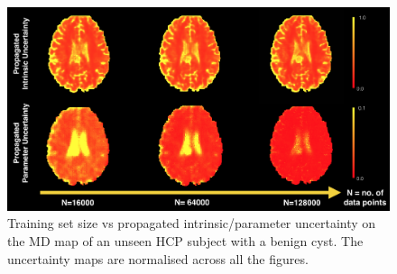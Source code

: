 \begin{figure}[ht] 
	\centering
	\includegraphics[width=\linewidth]{chapter_3/figures/fig_8_5.png}
	\small
	\caption{Training set size vs propagated intrinsic/parameter uncertainty on the MD map of an unseen HCP subject with a benign cyst. The uncertainty maps are normalised across all the figures. } 
	\label{fig:uncertainty_decomp_1}
\end{figure}
%
